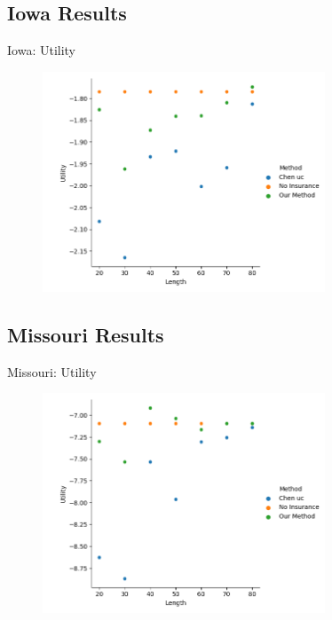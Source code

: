 \documentclass{beamer}
\begin{document}
\subsection*{Iowa Results}
\begin{frame}{Iowa: Utility}
    \begin{figure}
        \includegraphics[width=0.75\textwidth]{../../../output/figures/Evaluation 2/Iowa_Utility_Length_ml1.png}
    \end{figure}
\end{frame}


\subsection*{Missouri Results}
\begin{frame}{Missouri: Utility}
    \begin{figure}
        \includegraphics[width=0.75\textwidth]{../../../output/figures/Evaluation 2/Missouri_Utility_Length_ml1.png}
    \end{figure}
\end{frame}
\end{document}
